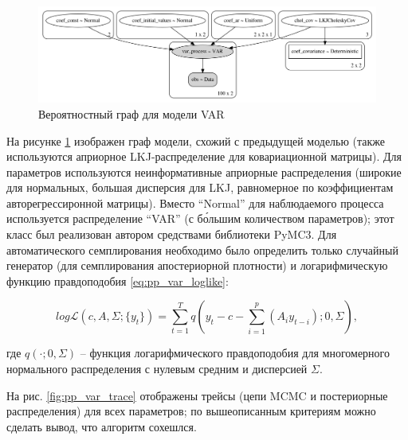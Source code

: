 \documentclass[a4paper,14pt]{extreport}
\begin{document}
\begin{figure}[H]
	\includegraphics[width=\linewidth]{img/gen/pp_var_graph.png}
	\caption{Вероятностный граф для модели VAR}
	\label{fig:pp_var_graph}
\end{figure}

На рисунке \ref{fig:pp_var_graph} изображен граф модели, схожий с предыдущей моделью (также используются априорное LKJ-распределение для ковариационной матрицы). Для параметров используются неинформативные априорные распределения (широкие для нормальных, большая дисперсия для LKJ, равномерное по коэффициентам авторегрессиронной матрицы). Вместо ``Normal'' для наблюдаемого процесса используется распределение ``VAR'' (с б\'{о}льшим количеством параметров); этот класс был реализован автором средствами библиотеки PyMC3. Для автоматического семплирования необходимо было определить только случайный генератор (для семплирования апостериорной плотности) и логарифмическую функцию правдоподобия \ref{eq:pp_var_loglike}:

\begin{equation}
	\mathit{log}\mathcal{L}(c, A, \Sigma; \{y_t\})
	=
	\sum\limits_{t=1}^{T}{
	q(y_t - c - \sum_{i=1}^{p}{(A_i y_{t-i})}; 0, \Sigma)
	} ,
	\label{eq:pp_var_loglike}
\end{equation}

\noindent
где $q(\cdot; 0, \Sigma)$ -- функция логарифмического правдоподобия для многомерного нормального распределения с нулевым средним и дисперсией $\Sigma$.

На рис. \ref{fig:pp_var_trace} отображены трейсы (цепи MCMC и постериорные распределения) для всех параметров; по вышеописанным критериям \cite{stan_user_guide} можно сделать вывод, что алгоритм сохешлся.
\end{document}

